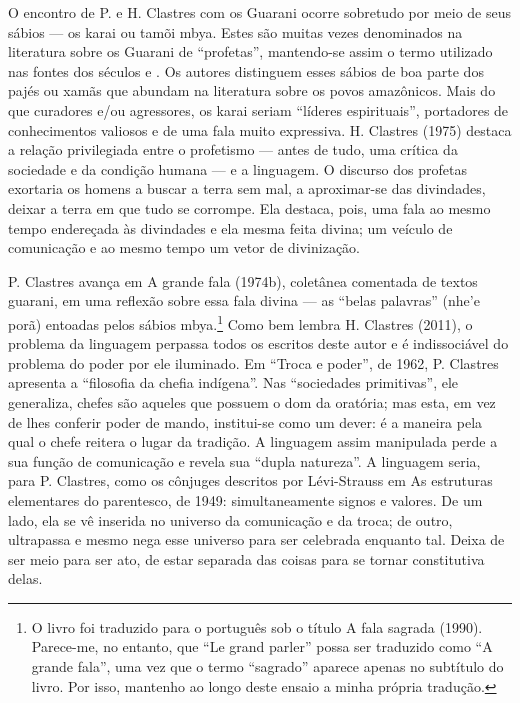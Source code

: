 O encontro de P. e H. Clastres com os Guarani ocorre sobretudo por meio
de seus sábios — os karai ou tamõi mbya. Estes são muitas vezes
denominados na literatura sobre os Guarani de ``profetas'', mantendo-se
assim o termo utilizado nas fontes dos séculos  e . Os autores
distinguem esses sábios de boa parte dos pajés ou xamãs que abundam na
literatura sobre os povos amazônicos. Mais do que curadores e/ou
agressores, os karai seriam ``líderes espirituais'', portadores de
conhecimentos valiosos e de uma fala muito expressiva. H. Clastres
(1975) destaca a relação privilegiada entre o profetismo — antes de
tudo, uma crítica da sociedade e da condição humana — e a linguagem. O
discurso dos profetas exortaria os homens a buscar a terra sem mal, a
aproximar-se das divindades, deixar a terra em que tudo se corrompe.
Ela destaca, pois, uma fala ao mesmo tempo endereçada às divindades e
ela mesma feita divina; um veículo de comunicação e ao mesmo tempo um
vetor de divinização.

P. Clastres avança em A grande fala (1974b), coletânea comentada de
textos guarani, em uma reflexão sobre essa fala divina — as ``belas
palavras'' (nhe’e porã) entoadas pelos sábios mbya.\footnote{O livro foi
traduzido para o português sob o título A fala sagrada (1990).
Parece-me, no entanto, que ``Le grand parler'' possa ser traduzido como
``A grande fala'', uma vez que o termo ``sagrado'' aparece apenas no
subtítulo do livro. Por isso, mantenho ao longo deste ensaio a minha
própria tradução.} Como bem lembra H. Clastres (2011), o problema da
linguagem perpassa todos os escritos deste autor e é indissociável do
problema do poder por ele iluminado. Em ``Troca e poder'', de 1962, P.
Clastres apresenta a ``filosofia da chefia indígena''. Nas ``sociedades
primitivas'', ele generaliza, chefes são aqueles que possuem o dom da
oratória; mas esta, em vez de lhes conferir poder de mando, institui-se
como um dever: é a maneira pela qual o chefe reitera o lugar da
tradição. A linguagem assim manipulada perde a sua função de
comunicação e revela sua ``dupla natureza''. A linguagem seria, para P.
Clastres, como os cônjuges descritos por Lévi-Strauss em As estruturas
elementares do parentesco, de 1949: simultaneamente signos e valores.
De um lado, ela se vê inserida no universo da comunicação e da troca;
de outro, ultrapassa e mesmo nega esse universo para ser celebrada
enquanto tal. Deixa de ser meio para ser ato, de estar separada das
coisas para se tornar constitutiva delas. 

